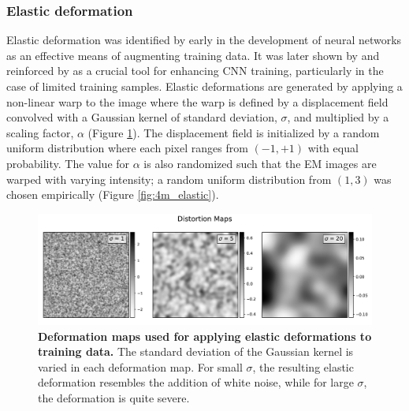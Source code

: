 \subsubsection{Elastic deformation}
Elastic deformation was identified by \textcite{simard2003best} early in the development of neural networks as an effective means of augmenting training data. It was later shown by \textcite{dosovitskiy2014discriminative} and reinforced by \textcite{ronneberger2015u} as a crucial tool for enhancing CNN training, particularly in the case of limited training samples. Elastic deformations are generated by applying a non-linear warp to the image where the warp is defined by a displacement field convolved with a Gaussian kernel of standard deviation, $\sigma$, and multiplied by a scaling factor, $\alpha$ (Figure \ref{fig:4m_maps}). The displacement field is initialized by a random uniform distribution where each pixel ranges from $(-1, +1)$ with equal probability. The value for $\alpha$ is also randomized such that the EM images are warped with varying intensity; a random uniform distribution from $(1, 3)$ was chosen empirically (Figure \ref{fig:4m_elastic}).

\begin{figure}[!tbh]
    \centering
    \includegraphics[width=\linewidth]{chapter-4/mfigs/mfig_maps.pdf}
    \caption{\textbf{Deformation maps used for applying elastic deformations to training data.}
    The standard deviation of the Gaussian kernel is varied in each deformation map. For small $\sigma$, the resulting elastic deformation resembles the addition of white noise, while for large $\sigma$, the deformation is quite severe.}
    \label{fig:4m_maps}
\end{figure}

